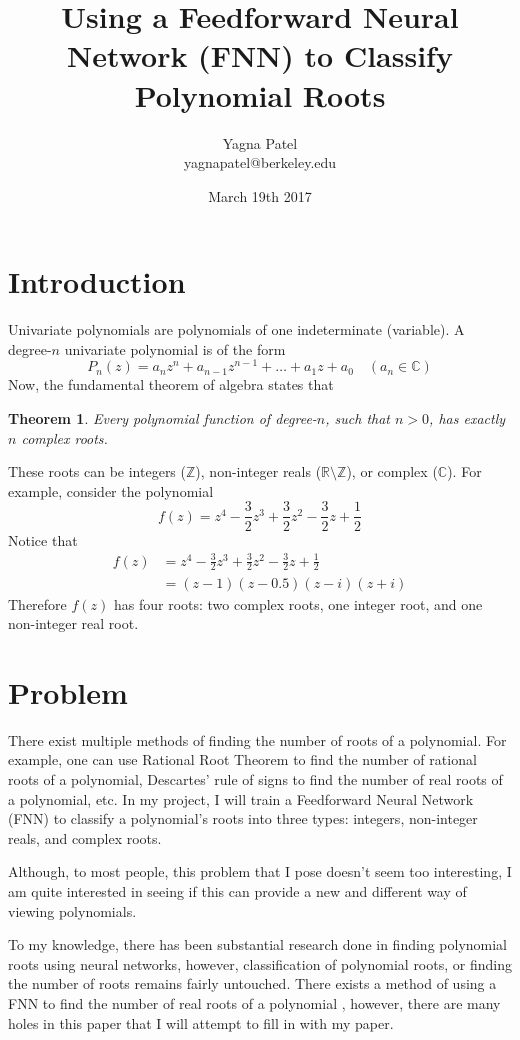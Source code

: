 \documentclass{article}
\title{Using a Feedforward Neural Network (FNN) to Classify Polynomial Roots}
\author{Yagna Patel \\ yagnapatel@berkeley.edu}
\date{March 19th 2017}
\newtheorem{theorem}{Theorem}
\begin{document}
\maketitle

\section{Introduction}
Univariate polynomials are polynomials of one indeterminate (variable). A degree-$n$ univariate polynomial is of the form $$P_n(z) = a_nz^n + a_{n-1}z^{n-1} + \ldots + a_1z + a_0\quad (a_n\in\mathbb{C})$$ Now, the fundamental theorem of algebra states that \begin{theorem}Every polynomial function of degree-$n$, such that $n>0$, has exactly $n$ complex roots.\end{theorem} \noindent These roots can be integers ($\mathbb{Z}$), non-integer reals ($\mathbb{R}\setminus\mathbb{Z}$), or complex ($\mathbb{C}$). For example, consider the polynomial $$f(z) = z^4-\frac{3}{2}z^3+\frac{3}{2}z^2-\frac{3}{2}z+\frac{1}{2}$$ Notice that \begin{align*}f(z) &= z^4-\frac{3}{2}z^3+\frac{3}{2}z^2-\frac{3}{2}z+\frac{1}{2} \\&= (z-1)(z-0.5)(z-i)(z+i)\end{align*} Therefore $f(z)$ has four roots: two complex roots, one integer root, and one non-integer real root.

\section{Problem}
There exist multiple methods of finding the number of roots of a polynomial. For example, one can use Rational Root Theorem to find the number of rational roots of a polynomial, Descartes' rule of signs to find the number of real roots of a polynomial, etc. In my project, I will train a Feedforward Neural Network (FNN) to classify a polynomial's roots into three types: integers, non-integer reals, and complex roots. 
\vspace{4pt}

\noindent Although, to most people, this problem that I pose doesn't seem too interesting, I am quite interested in seeing if this can provide a new and different way of viewing polynomials. 

\vspace{4pt}

\noindent To my knowledge, there has been substantial research done in finding polynomial roots using neural networks, however, classification of polynomial roots, or finding the number of roots remains fairly untouched. There exists a method of using a FNN to find the number of real roots of a polynomial \cite{real_roots}, however, there are many holes in this paper that I will attempt to fill in with my paper. 
\end{document}
